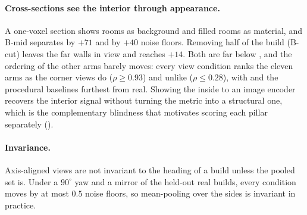 \paragraph{Cross-sections see the interior through appearance.} A one-voxel section shows
rooms as background and filled rooms as material, and B-mid separates \solidify{} by
$+71$ and \hollow{} by $+40$ noise floors. Removing half of the build (B-cut) leaves the
far walls in view and reaches $+14$. Both are far below \vkid{}, and the ordering of the
other arms barely moves: every view condition ranks the eleven arms as the corner views
do ($\rho \ge 0.93$) and unlike \vkid{} ($\rho \le 0.28$), with \monochrome{} and the
procedural baselines furthest from real. Showing the inside to an image encoder recovers
the interior signal without turning the metric into a structural one, which is the
complementary blindness that motivates scoring each pillar separately
().

\paragraph{Invariance.} Axis-aligned views are not invariant to the heading of a build
unless the pooled set is. Under a $90^\circ$ yaw and a mirror of the held-out real builds,
every condition moves by at most $0.5$ noise floors, so mean-pooling over the sides is
invariant in practice.
